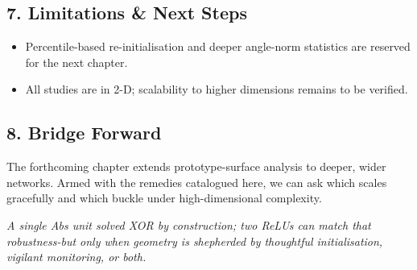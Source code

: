 \subsection*{7.  Limitations \& Next Steps}
\begin{itemize}
  \item Percentile-based re-initialisation and deeper angle-norm
        statistics are reserved for the next chapter.
  \item All studies are in 2-D; scalability to higher dimensions remains
        to be verified.
\end{itemize}

\subsection*{8.  Bridge Forward}
The forthcoming chapter extends prototype-surface analysis
to deeper, wider networks.  Armed with the remedies catalogued here, we
can ask which scales gracefully and which buckle under high-dimensional
complexity.

\medskip
\begin{center}
\emph{A single Abs unit solved XOR by construction; two ReLUs can match
that robustness-but only when geometry is shepherded by thoughtful
initialisation, vigilant monitoring, or both.}
\end{center}
